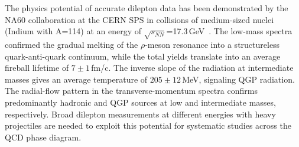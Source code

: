 The physics potential of accurate dilepton data has been demonstrated by the NA60
collaboration at the CERN SPS in collisions of medium-sized nuclei (Indium with A=114)
at an energy of
$\sqrt{s_{NN}}$=17.3\,GeV~\cite{Arnaldi:2008fw,Arnaldi:2008er,Specht:2010xu}. The
low-mass spectra confirmed the gradual melting of the $\rho$-meson resonance into a
structureless quark-anti-quark continuum, while the total yields translate into an
average fireball lifetime of $7\pm1$\,fm/c. The inverse slope of the radiation at
intermediate masses gives an average temperature of $205\pm12$\,MeV, signaling QGP
radiation. The radial-flow pattern in the transverse-momentum spectra confirms
predominantly hadronic and QGP sources at low and intermediate masses, respectively.
Broad dilepton measurements at different energies with heavy projectiles are needed
to exploit this potential for systematic studies across the QCD phase diagram.

